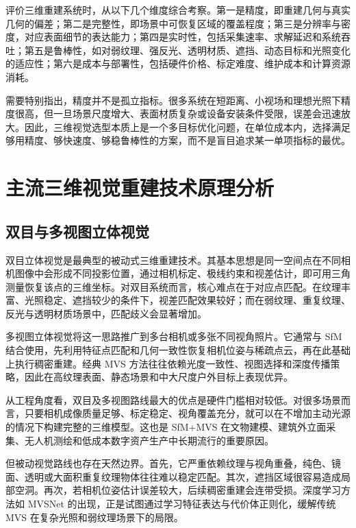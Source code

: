 \documentclass[12pt,a4paper]{ctexart}
\begin{document}
评价三维重建系统时，从以下几个维度综合考察。第一是精度，即重建几何与真实几何的偏差；第二是完整性，即场景中可恢复区域的覆盖程度；第三是分辨率与密度，对应表面细节的表达能力；第四是实时性，包括采集速率、求解延迟和系统吞吐；第五是鲁棒性，如对弱纹理、强反光、透明材质、遮挡、动态目标和光照变化的适应性；第六是成本与部署性，包括硬件价格、标定难度、维护成本和计算资源消耗。\cite{seitz2006,schoeps2017eth3d,he2017toferror,cheng2018laser}

需要特别指出，精度并不是孤立指标。很多系统在短距离、小视场和理想光照下精度很高，但一旦场景尺度增大、表面材质复杂或设备安装条件受限，误差会迅速放大。因此，三维视觉选型本质上是一个多目标优化问题，在单位成本内，选择满足够用精度、够快速度、够稳鲁棒性的方案，而不是盲目追求某一单项指标的最优。

\section{主流三维视觉重建技术原理分析}

\subsection{双目与多视图立体视觉}

双目立体视觉是最典型的被动式三维重建技术。其基本思想是同一空间点在不同相机图像中会形成不同投影位置，通过相机标定、极线约束和视差估计，即可用三角测量恢复该点的三维坐标。对双目系统而言，核心难点在于对应点匹配。在纹理丰富、光照稳定、遮挡较少的条件下，视差匹配效果较好；而在弱纹理、重复纹理、反光与透明材质场景中，匹配歧义会显著增加。\cite{scharstein2003,seitz2006}

多视图立体视觉将这一思路推广到多台相机或多张不同视角照片。它通常与 SfM 结合使用，先利用特征点匹配和几何一致性恢复相机位姿与稀疏点云，再在此基础上执行稠密重建。经典 MVS 方法往往依赖光度一致性、视图选择和深度传播策略，因此在高纹理表面、静态场景和中大尺度户外目标上表现优异。\cite{schonberger2016sfm,schonberger2016mvs,seitz2006}

从工程角度看，双目及多视图路线最大的优点是硬件门槛相对较低。对很多场景而言，只要相机成像质量足够、标定稳定、视角覆盖充分，就可以在不增加主动光源的情况下构建完整的三维模型。这也是 SfM+MVS 在文物建模、建筑外立面采集、无人机测绘和低成本数字资产生产中长期流行的重要原因。\cite{schonberger2016sfm,schonberger2016mvs,schoeps2017eth3d}

但被动视觉路线也存在天然边界。首先，它严重依赖纹理与视角重叠，纯色、镜面、透明或大面积重复纹理物体往往难以稳定匹配。其次，遮挡区域很容易造成局部空洞。再次，若相机位姿估计误差较大，后续稠密重建会连带受损。深度学习方法如 MVSNet 的出现，正是试图通过学习特征表达与代价体正则化，缓解传统 MVS 在复杂光照和弱纹理场景下的局限。\cite{yao2018mvsnet}
\end{document}
